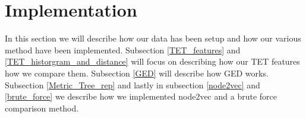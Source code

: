 \section{Implementation}\label{Implementation}
In this section we will describe how our data has been setup and how our various method have been implemented. Subsection \ref{TET_features} and \ref{TET_historgram_and_distance} will focus on describing how our TET features how we compare them. Subsection \ref{GED} will describe how GED works. Subsection \ref{Metric_Tree_rep} and lastly in subsection \ref{node2vec} and \ref{brute_force} we describe how we implemented node2vec and a brute force comparison method.






